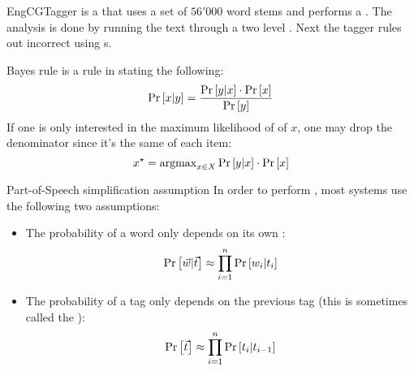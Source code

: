 \begin{df}[Voutilainen]{EngCGTagger}
\sb{} is a  that uses a set of $56'000$ word stems and performs a . The analysis is done by running the text through a two level . Next the tagger rules out incorrect  using s.
\end{df}
\begin{tm}{Bayes rule}
\sb{} is a rule in  stating the following:
\begin{equation}
\Pr\left[x|y\right]=\displaystyle\frac{\Pr\left[y|x\right]\cdot\Pr\left[x\right]}{\Pr\left[y\right]}
\end{equation}
If one is only interested in the maximum likelihood of of $x$, one may drop the denominator since it's the same of each item:
\begin{equation}
x^{\star}=\operatorname{argmax}_{x\in X}\Pr\left[y|x\right]\cdot\Pr\left[x\right]
\end{equation}
\end{tm}
\begin{tm}{Part-of-Speech simplification assumption}
In order to perform , most systems use the following two assumptions:
\begin{itemize}
 \item The probability of a word only depends on its own :
 \begin{equation}
  \Pr\left[\vec{w}|\vec{t}\right]\approx\displaystyle\prod_{i=1}^n{\Pr\left[w_i|t_i\right]}
 \end{equation}
 \item The probability of a tag only depends on the previous tag (this is sometimes called the ):
 \begin{equation}
  \Pr\left[\vec{t}\right]\approx\displaystyle\prod_{i=1}^{n}\Pr\left[t_i|t_{i-1}\right]
 \end{equation}
\end{itemize}
\end{tm}

